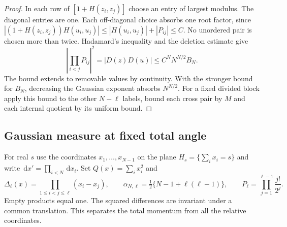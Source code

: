 \documentclass[11pt]{article}
\numberwithin{equation}{section}
\theoremstyle{definition}
\newcommand{\dd}{\,\mathrm d}
\begin{document}
\begin{proof}
In each row of $[1+H(z_i,z_j)]$ choose an entry of largest modulus.
The diagonal entries are one. Each off-diagonal choice absorbs one
root factor, since
$|(1+H(z_i,z_j))H(u_i,u_j)|\le |H(u_i,u_j)|+|P_{ij}|\le C$.
No unordered pair is chosen more than twice. Hadamard's inequality
and the deletion estimate give
\[
 \left|\prod_{i<j}P_{ij}\right|^2=|D(z)D(u)|
      \le C^N N^{N/2} B_N .
\]
The bound extends to removable values by continuity. With the stronger
bound for $B_N$, decreasing the Gaussian exponent absorbs $N^{N/2}$.
For a fixed divided block apply this bound to the other $N-\ell$
labels, bound each cross pair by $M$ and each internal quotient by
its uniform bound.
\end{proof}

\subsection{Gaussian measure at fixed total angle}

For real $s$ use the coordinates $x_1,\ldots,x_{N-1}$ on the plane
$H_s=\{\sum_i x_i=s\}$ and write $\dd x'=\prod_{i<N}\dd x_i$.
Set $Q(x)=\sum_i x_i^2$ and
\[
 \Delta_\ell(x)=\prod_{1\le i<j\le\ell}(x_i-x_j),\qquad
 \alpha_{N,\ell}=\tfrac12\{N-1+\ell(\ell-1)\},\qquad
 P_\ell=\prod_{j=1}^{\ell-1}\frac{j!}{2^j}.
\]
Empty products equal one. The squared differences are invariant under
a common translation. This separates the total momentum from all the
relative coordinates.
\end{document}
